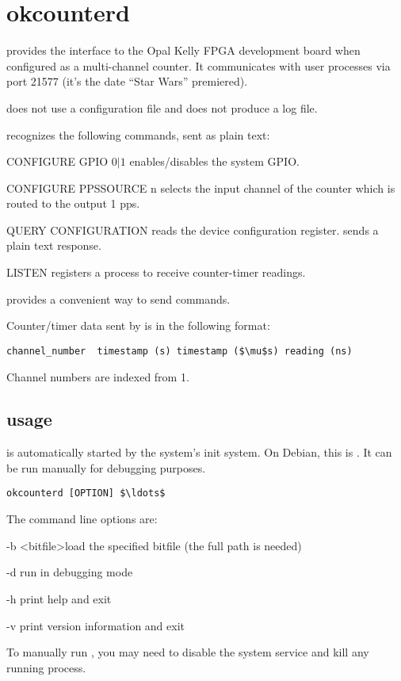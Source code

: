 
\section{okcounterd \label{sokcounterd}}

 provides the interface to the Opal Kelly FPGA development board when configured as a multi-channel counter.
It communicates with user processes via port 21577 (it's the date ``Star Wars'' premiered).

 does not use a configuration file and does not produce a log file.

 recognizes the following commands, sent as plain text:
\begin{description*}
	\item[] CONFIGURE GPIO $0\vert1$ enables/disables the system GPIO.
	\item[] CONFIGURE PPSSOURCE n selects the input channel of the counter which is
	routed to the output 1 pps. 
	\item[] QUERY CONFIGURATION reads the device configuration register.  sends
	a plain text response.
	\item[] LISTEN registers a process to receive counter-timer readings.
\end{description*}
 provides a convenient way to send commands.

Counter/timer data sent by  is in the following format:
\begin{lstlisting}[mathescape=true]
channel_number  timestamp (s) timestamp ($\mu$s) reading (ns)
\end{lstlisting}
Channel numbers are indexed from 1.

\subsection{usage}
 is automatically started by the system's init system. On Debian, this is . 
It can be run manually for debugging purposes.
\begin{lstlisting}[mathescape=true]
okcounterd [OPTION] $\ldots$
\end{lstlisting}
The command line options are:
\begin{description*}
	\item[-b] \textless bitfile\textgreater load the specified bitfile (the full path is needed)
	\item[-d]	run in debugging mode
	\item[-h]	print help and exit
	\item[-v]	print version information and exit
\end{description*}
To manually run , you may need to disable the system service
and kill any running  process.
